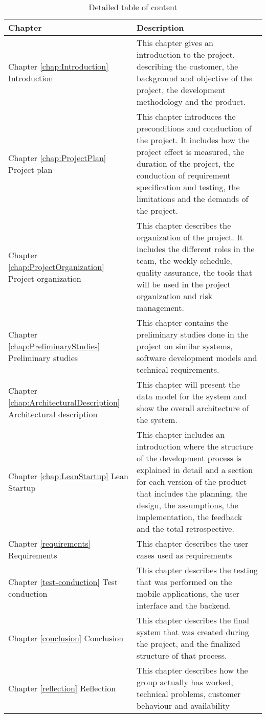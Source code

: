 \begin{table}
\tiny
\centering
\begin{tabular}{|L{0.10\textwidth}|L{0.90\textwidth}|}
\hline
Chapter & Description \\
\hline
Chapter \ref{chap:Introduction} Introduction & This chapter gives an introduction to the project, describing the customer, the background and objective of the project, the development methodology and the product. \\
\hline
Chapter \ref{chap:ProjectPlan} Project plan & This chapter introduces the preconditions and conduction of the project. It includes how the project effect is measured, the duration of the project, the conduction of requirement specification and testing, the limitations and the demands of the project. \\
\hline
Chapter \ref{chap:ProjectOrganization} Project organization & This chapter describes the organization of the project. It includes the different roles in the team, the weekly schedule, quality assurance, the tools that will be used in the project organization and risk management. \\
\hline
Chapter \ref{chap:PreliminaryStudies} Preliminary studies & This chapter contains the preliminary studies done in the project on similar systems, software development models and technical requirements. \\
\hline
Chapter \ref{chap:ArchitecturalDescription} Architectural description & This chapter will present the data model for the system and show the overall architecture of the system.  \\
\hline
Chapter \ref{chap:LeanStartup} Lean Startup & This chapter includes an introduction where the structure of the development process is explained in detail and a section for each version of the product that includes the planning, the design, the assumptions, the implementation, the feedback and the total retrospective. \\ 
\hline
Chapter \ref{requirements} Requirements & This chapter describes the user cases used as requirements \\
\hline
Chapter \ref{test-conduction} Test conduction & This chapter describes the testing that was performed on the mobile applications, the user interface and the \gls{backend}. \\
\hline
Chapter \ref{conclusion} Conclusion & This chapter describes the final system that was created during the project, and the finalized structure of that process. \\
\hline
Chapter \ref{reflection} Reflection & This chapter describes how the group actually has worked, technical problems, customer behaviour and availability\\
\hline
\end{tabular}
\caption{Detailed table of content}
\label{tab:table-of-content}
\end{table}